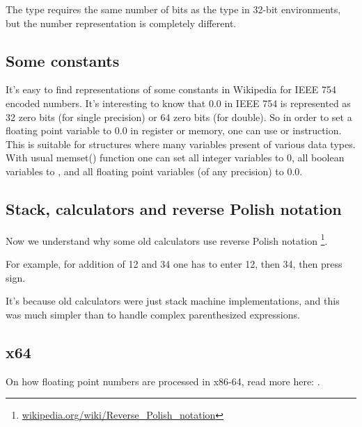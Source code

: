 The \Tfloat type requires the same number of bits as the \Tint type in 32-bit environments, 
but the number representation is completely different.





\subsection{Some constants}

It's easy to find representations of some constants in Wikipedia for IEEE 754 encoded numbers.
It's interesting to know that 0.0 in IEEE 754 is represented as 32 zero bits (for single precision) or 64 zero bits
(for double).
So in order to set a floating point variable to 0.0 in register or memory, one can use \MOV or  instruction.
This is suitable for structures where many variables present of various data types.
With usual memset() function one can set all integer variables to 0, all boolean variables to ,
and all floating point variables (of any precision) to 0.0.

\subsection{Stack, calculators and reverse Polish notation}


Now we understand why some old calculators use reverse Polish notation
\footnote{\href{http://go.yurichev.com/17354}{wikipedia.org/wiki/Reverse\_Polish\_notation}}.

For example, for addition of 12 and 34 one has to enter 12, then 34, then press  sign.

It's because old calculators were just stack machine implementations, and this was much simpler
than to handle complex parenthesized expressions.
\subsection{x64}

On how floating point numbers are processed in x86-64, read more here: .


